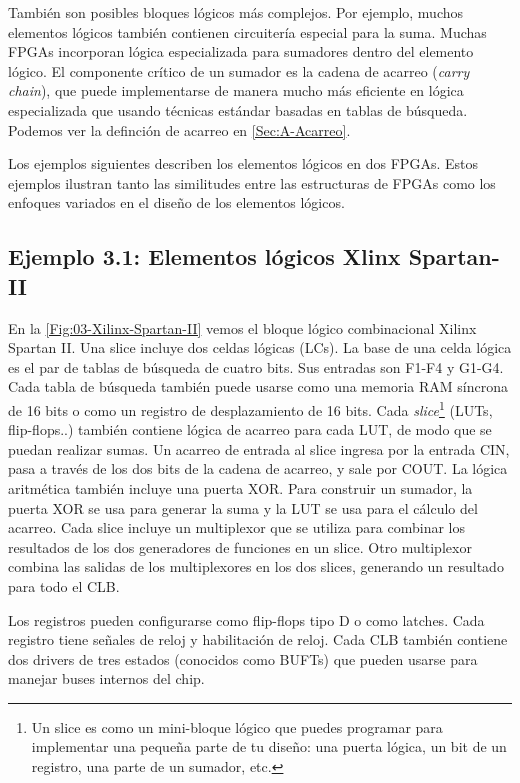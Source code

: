 También son posibles bloques lógicos más complejos. Por ejemplo, muchos elementos lógicos también contienen circuitería especial para la suma. Muchas FPGAs incorporan lógica especializada para sumadores dentro del elemento lógico. El componente crítico de un sumador es la cadena de acarreo (\textit{carry chain}), que puede implementarse de manera mucho más eficiente en lógica especializada que usando técnicas estándar basadas en tablas de búsqueda. Podemos ver la definción de acarreo en \cref{Sec:A-Acarreo}. 

Los ejemplos siguientes describen los elementos lógicos en dos FPGAs. Estos ejemplos ilustran tanto las similitudes entre las estructuras de FPGAs como los enfoques variados en el diseño de los elementos lógicos.


\vspace*{1em}

\begin{Enunciado}
\subsection*{Ejemplo 3.1: Elementos lógicos Xlinx Spartan-II}
\end{Enunciado}

En la \cref{Fig:03-Xilinx-Spartan-II} vemos el bloque lógico combinacional Xilinx Spartan II. Una slice incluye dos celdas lógicas (LCs). La base de una celda lógica es el par de tablas de búsqueda de cuatro bits. Sus entradas son F1-F4 y G1-G4. Cada tabla de búsqueda también puede usarse como una memoria RAM síncrona de 16 bits o como un registro de desplazamiento de 16 bits. Cada \textit{slice}\footnote{Un slice es como un mini-bloque lógico que puedes programar para implementar una pequeña parte de tu diseño: una puerta lógica, un bit de un registro, una parte de un sumador, etc.}  (LUTs, flip-flops..) también contiene lógica de acarreo para cada LUT, de modo que se puedan realizar sumas. Un acarreo de entrada al slice ingresa por la entrada CIN, pasa a través de los dos bits de la cadena de acarreo, y sale por COUT. La lógica aritmética también incluye una puerta XOR. Para construir un sumador, la puerta XOR se usa para generar la suma y la LUT se usa para el cálculo del acarreo. Cada slice incluye un multiplexor que se utiliza para combinar los resultados de los dos generadores de funciones en un slice. Otro multiplexor combina las salidas de los multiplexores en los dos slices, generando un resultado para todo el CLB.

Los registros pueden configurarse como flip-flops tipo D o como latches. Cada registro tiene señales de reloj y habilitación de reloj. Cada CLB también contiene dos drivers de tres estados (conocidos como BUFTs) que pueden usarse para manejar buses internos del chip.

